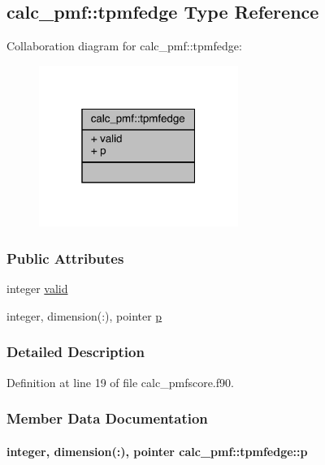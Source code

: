 \hypertarget{structcalc__pmf_1_1tpmfedge}{\subsection{calc\-\_\-pmf\-:\-:tpmfedge Type Reference}
\label{structcalc__pmf_1_1tpmfedge}
}


Collaboration diagram for calc\-\_\-pmf\-:\-:tpmfedge\-:
\nopagebreak
\begin{figure}[H]
\begin{center}
\leavevmode
\includegraphics[width=184pt]{structcalc__pmf_1_1tpmfedge__coll__graph}
\end{center}
\end{figure}
\subsubsection*{Public Attributes}
\begin{DoxyCompactItemize}
\item 
integer \hyperlink{structcalc__pmf_1_1tpmfedge_a9590ce792a9baa267959e9b057c7dd28}{valid}
\item 
integer, dimension(\-:), pointer \hyperlink{structcalc__pmf_1_1tpmfedge_a73c2f777150205250af3c84b6d947b4e}{p}
\end{DoxyCompactItemize}


\subsubsection{Detailed Description}


Definition at line 19 of file calc\-\_\-pmfscore.\-f90.



\subsubsection{Member Data Documentation}
\hypertarget{structcalc__pmf_1_1tpmfedge_a73c2f777150205250af3c84b6d947b4e}{
\paragraph[{p}]{\setlength{\rightskip}{0pt plus 5cm}integer, dimension(\-:), pointer calc\-\_\-pmf\-::tpmfedge\-::p}}\label{structcalc__pmf_1_1tpmfedge_a73c2f777150205250af3c84b6d947b4e}


